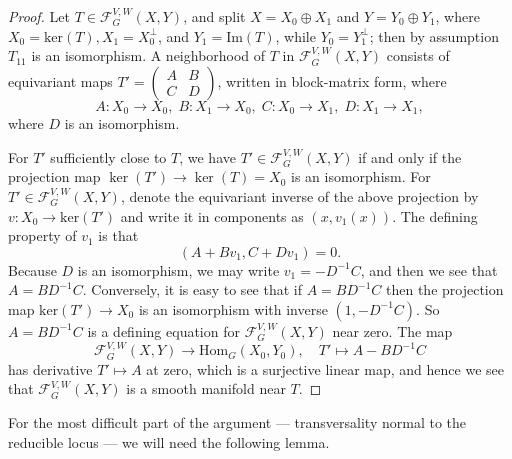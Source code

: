 \documentclass[10pt,a4paper]{amsart}
\theoremstyle{definition}
\theoremstyle{remark}
\numberwithin{figure}{qchap}
\begin{document}
\begin{proof}Let $T \in \mathcal F^{V,W}_G(X, Y)$, and split $X = X_0 \oplus X_1$ and $Y = Y_0 \oplus Y_1$, where $X_0 = \text{ker}(T), X_1 = X_0^\perp$, and $Y_1 = \text{Im}(T)$, while $Y_0 = Y_1^\perp$; then by assumption $T_{11}$ is an isomorphism. A neighborhood of $T$ in $\mathcal F^{V,W}_G(X, Y)$ consists of equivariant maps $T' = \begin{pmatrix}A & B\\ C & D\end{pmatrix}$, written in block-matrix form, where
$$A: X_0 \to X_0, \; B: X_1 \to X_0, \; C: X_0 \to X_1, \; D: X_1 \to X_1,$$
where $D$ is an isomorphism. 

For $T'$ sufficiently close to $T$, we have $T' \in \mathcal F^{V,W}_G(X,Y)$ if and only if the projection map $\ker(T') \to \ker(T) = X_0$ is an isomorphism. For $T' \in \mathcal F^{V,W}_G(X,Y)$, denote the equivariant inverse of the above projection by $v: X_0 \to \text{ker}(T')$ and write it in components as $(x, v_1(x))$. The defining property of $v_1$ is that $$(A + Bv_1, C + Dv_1) = 0.$$ Because $D$ is an isomorphism, we may write $v_1 = - D^{-1} C$, and then we see that $A= BD^{-1} C.$ Conversely, it is easy to see that if $A = BD^{-1} C$ then the projection map $\text{ker}(T') \to X_0$ is an isomorphism with inverse $(1, -D^{-1} C)$. So $A = BD^{-1} C$ is a defining equation for $\mathcal F^{V,W}_G(X, Y)$ near zero. The map 
$$\mathcal F^{V,W}_G(X,Y) \to \text{Hom}_G(X_0, Y_0), \quad T' \mapsto A - BD^{-1} C$$
has derivative $T' \mapsto A$ at zero, which is a surjective linear map, and hence we see that $\mathcal F^{V, W}_G(X, Y)$ is a smooth manifold near $T$.
\end{proof}

For the most difficult part of the argument --- transversality normal to the reducible locus --- we will need the following lemma. 
\end{document}
